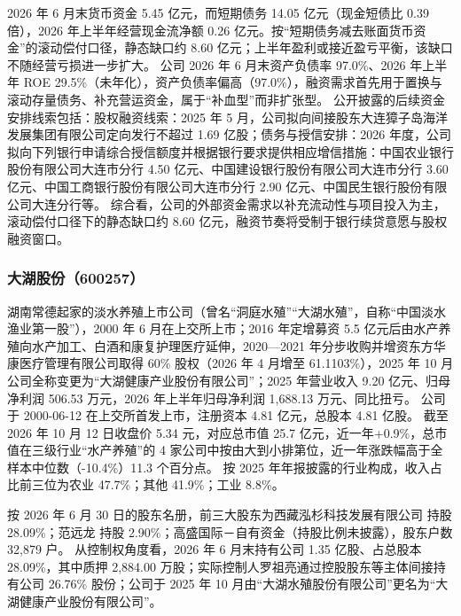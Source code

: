  2026 年 6 月末货币资金 5.45 亿元，而短期债务 14.05 亿元（现金短债比 0.39 倍），2026 年上半年经营现金流净额 0.26 亿元。按“短期债务减去账面货币资金”的滚动偿付口径，静态缺口约 8.60 亿元；上半年盈利或接近盈亏平衡，该缺口不随经营亏损进一步扩大。 公司 2026 年 6 月末资产负债率 97.0\%、2026 年上半年 ROE 29.5\%（未年化），资产负债率偏高（97.0\%），融资需求首先用于置换与滚动存量债务、补充营运资金，属于“补血型”而非扩张型。 公开披露的后续资金安排线索包括：股权融资线索：2025 年 5 月，公司拟向间接股东大连獐子岛海洋发展集团有限公司定向发行不超过 1.69 亿股；债务与授信安排：2026 年度，公司拟向下列银行申请综合授信额度并根据银行要求提供相应增信措施：中国农业银行股份有限公司大连市分行 4.50 亿元、中国建设银行股份有限公司大连市分行 3.60 亿元、中国工商银行股份有限公司大连市分行 2.90 亿元、中国民生银行股份有限公司大连分行等。 综合看，公司的外部资金需求以补充流动性与项目投入为主，滚动偿付口径下的静态缺口约 8.60 亿元，融资节奏将受制于银行续贷意愿与股权融资窗口。




\subsubsection{大湖股份（600257）}
\label{co:600257}

 湖南常德起家的淡水养殖上市公司（曾名“洞庭水殖”“大湖水殖”，自称“中国淡水渔业第一股”），2000 年 6 月在上交所上市；2016 年定增募资 5.5 亿元后由水产养殖向水产加工、白酒和康复护理医疗延伸，2020—2021 年分步收购并增资东方华康医疗管理有限公司取得 60\% 股权（2026 年 4 月增至 61.1103\%），2025 年 10 月公司全称变更为“大湖健康产业股份有限公司”；2025 年营业收入 9.20 亿元、归母净利润 506.53 万元，2026 年上半年归母净利润 1,688.13 万元、同比扭亏。 公司于 2000-06-12 在上交所首发上市，注册资本 4.81 亿元，总股本 4.81 亿股。 截至 2026 年 10 月 12 日收盘价 5.34 元，对应总市值 25.7 亿元，近一年+0.9\%，总市值在三级行业“水产养殖”的 4 家公司中按由大到小排第位，近一年涨跌幅高于全样本中位数（-10.4\%）11.3 个百分点。 按 2025 年年报披露的行业构成，收入占比前三位为农业 47.7\%；其他 41.9\%；工业 8.8\%。

 按 2026 年 6 月 30 日的股东名册，前三大股东为西藏泓杉科技发展有限公司 持股 28.09\%；范远龙 持股 2.90\%；高盛国际－自有资金（持股比例未披露），股东户数 32,879 户。 从控制权角度看，2026 年 6 月末持有公司 1.35 亿股、占总股本 28.09\%，其中质押 2,884.00 万股；实际控制人罗祖亮通过控股股东等主体间接持有公司 26.76\% 股份；公司于 2025 年 10 月由“大湖水殖股份有限公司”更名为“大湖健康产业股份有限公司”。

